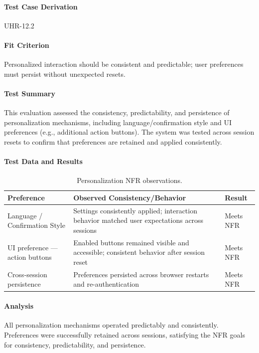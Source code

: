 \documentclass[12pt, titlepage]{article}
\begin{document}
\paragraph{Test Case Derivation} UHR-12.2

\paragraph{Fit Criterion}
Personalized interaction should be consistent and predictable; user preferences must persist without unexpected resets.

\paragraph{Test Summary}
This evaluation assessed the consistency, predictability, and persistence of personalization mechanisms, including language/confirmation style and UI preferences (e.g., additional action buttons). The system was tested across session resets to confirm that preferences are retained and applied consistently.

\paragraph{Test Data and Results}

\begin{table}[H]
\centering
\caption{Personalization NFR observations.}
\begin{tabular}{|p{4cm}|p{6cm}|p{3cm}|}
\hline
\textbf{Preference} & \textbf{Observed Consistency/Behavior} & \textbf{Result} \\ \hline
Language / Confirmation Style & Settings consistently applied; interaction behavior matched user expectations across sessions & Meets NFR \\ \hline
UI preference — action buttons & Enabled buttons remained visible and accessible; consistent behavior after session reset & Meets NFR \\ \hline
Cross-session persistence & Preferences persisted across browser restarts and re-authentication & Meets NFR \\ \hline
\end{tabular}
\label{tab:uh3_nfr}
\end{table}

\paragraph{Analysis}
All personalization mechanisms operated predictably and consistently. Preferences were successfully retained across sessions, satisfying the NFR goals for consistency, predictability, and persistence.
\end{document}
